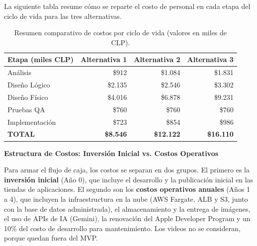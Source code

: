La siguiente tabla resume cómo se reparte el costo de personal en cada etapa del ciclo de vida para las tres alternativas.
\begin{table}[h!]
    \centering
    \renewcommand{\arraystretch}{1.4}
    \footnotesize
    \begin{tabular}{|m{2.8cm}|r|r|r|}
        \hline
        \rowcolor[HTML]{EFEFEF}
        \textbf{Etapa (miles CLP)} & \textbf{Alternativa 1} & \textbf{Alternativa 2} & \textbf{Alternativa 3} \\ \hline
        Análisis & \$912 & \$1.084& \$1.831 \\ \hline
        Diseño Lógico & \$2.135 & \$2.546 & \$3.302 \\ \hline
        Diseño Físico & \$4.016 & \$6.878 & \$9.231 \\ \hline
        Pruebas QA & \$760 & \$760 & \$760 \\ \hline
        Implementación & \$723 & \$854 & \$986 \\ \hline
        \rowcolor[HTML]{E8F5E9}
        \textbf{TOTAL} & \textbf{\$8.546} & \textbf{\$12.122} & \textbf{\$16.110} \\ \hline
    \end{tabular}
    \caption{Resumen comparativo de costos por ciclo de vida (valores en miles de CLP).}
    \label{tab:resumen_ciclovida}
\end{table}
\newpage
\textbf{Estructura de Costos: Inversión Inicial vs. Costos Operativos}

Para armar el flujo de caja, los costos se separan en dos grupos. El primero es la \textbf{inversión inicial} (Año 0), que incluye el desarrollo y la publicación inicial en las tiendas de aplicaciones. El segundo son los \textbf{costos operativos anuales} (Años 1 a 4), que incluyen la infraestructura en la nube (AWS Fargate, ALB y S3, junto con la base de datos administrada), el almacenamiento y la entrega de imágenes, el uso de APIs de IA (Gemini), la renovación del Apple Developer Program y un 10\% del costo de desarrollo para mantenimiento. Los videos no se consideran, porque quedan fuera del MVP.

